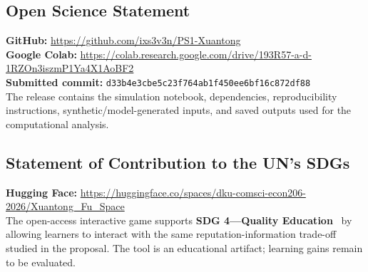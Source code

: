\subsection*{Open Science Statement}
\textbf{GitHub:} \url{https://github.com/ixs3v3n/PS1-Xuantong}\\
\textbf{Google Colab:} \url{https://colab.research.google.com/drive/193R57-a-d-1RZOn3iszmP1Ya4X1AoBF2}\\
\textbf{Submitted commit:} \texttt{d33b4e3cbe5c23f764ab1f450ee6bf16c872df88}\\
The release contains the simulation notebook, dependencies, reproducibility instructions, synthetic/model-generated inputs, and saved outputs used for the computational analysis.

\subsection*{Statement of Contribution to the UN's SDGs}
\textbf{Hugging Face:} \url{https://huggingface.co/spaces/dku-comsci-econ206-2026/Xuantong_Fu_Space}\\
The open-access interactive game supports \textbf{SDG 4---Quality Education}~\cite{sdg4} by allowing learners to interact with the same reputation-information trade-off studied in the proposal. The tool is an educational artifact; learning gains remain to be evaluated.
